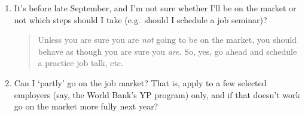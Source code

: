 \documentclass{\classes/econtex}
\begin{document}
\begin{enumerate}
\begin{quote}
\begin{comment}
      So, an important real and psychological point here is that failure
      to be included in the official list of candidates is almost (but not
      quite) equivalent to the end of all hope of obtaining a JHU PhD.  If
      a student uses wisely the time freed up by not participating in the
      job market to conduct an intense burst of high quality research, it
      is in principle quite possible that they will finish a dissertation
      despite their prior lack of progress.  The exclusion from the job
      market process may concentrate their minds in a way that has not
      happened before.

      Furthermore, if their dissertation defense occurs before the
      deadline for the `on-the-market' decision in the following year (mid
      October), the student can apply to jobs themselves (with the usual
      process, including advisors writing letters and giving them to the
      \JMStaff, etc), but without their name being officially
      included in list of `on-the-market' students.  They can also have a page on the dept
      website to which they can refer employers, but will not be included
      in the list of students ``on the market'' clickable from the main
      dept web page.  The
      situation will be explained candidly to employers as resulting from
      our inflexible rule that students must be on the market in their 6th
      year or earlier.  This is what we did with Farhan Hameed this year,
      and he did eventually get a couple of mediocre job offers, one of
      which he has accepted.

    \end{comment}


  \end{quote}
\item It's before late September, and I'm not sure whether I'll be on the market or not which steps should I take (e.g.\ should I schedule a job seminar)?

  \begin{quote}
    Unless you are sure you are \textit{not} going to be on the market, you should behave as though you are sure you \textit{are}.  So, yes, go ahead and schedule a practice job talk, etc.

  \end{quote}
\item  Can I `partly' go on the job market?  That is, apply to a few
  selected employers (say, the World Bank's YP program) only, and 
  if that doesn't work go on the market more fully next year?


\end{enumerate}
\end{document}
